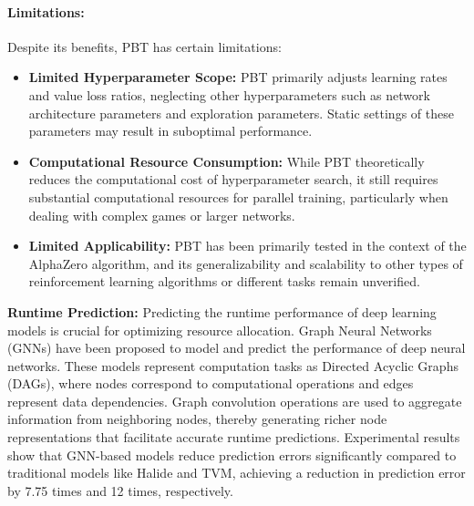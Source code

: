 \documentclass[10pt,journal,compsoc]{IEEEtran}
\begin{document}
\paragraph{Limitations:} Despite its benefits, PBT has certain limitations:
\begin{itemize}
    \item \textbf{Limited Hyperparameter Scope:} PBT primarily adjusts learning rates and value loss ratios, neglecting other hyperparameters such as network architecture parameters and exploration parameters. Static settings of these parameters may result in suboptimal performance.
    \item \textbf{Computational Resource Consumption:} While PBT theoretically reduces the computational cost of hyperparameter search, it still requires substantial computational resources for parallel training, particularly when dealing with complex games or larger networks.
    \item \textbf{Limited Applicability:} PBT has been primarily tested in the context of the AlphaZero algorithm, and its generalizability and scalability to other types of reinforcement learning algorithms or different tasks remain unverified.
\end{itemize}

\noindent\textbf{Runtime Prediction:} Predicting the runtime performance of deep learning models is crucial for optimizing resource allocation.
%
Graph Neural Networks (GNNs) \cite{gnn} have been proposed to model and predict the performance of deep neural networks. 
%
These models represent computation tasks as Directed Acyclic Graphs (DAGs), where nodes correspond to computational operations and edges represent data dependencies.
%
Graph convolution operations are used to aggregate information from neighboring nodes, thereby generating richer node representations that facilitate accurate runtime predictions.
%
Experimental results show that GNN-based models reduce prediction errors significantly compared to traditional models like Halide and TVM, achieving a reduction in prediction error by 7.75 times and 12 times, respectively.
\end{document}
